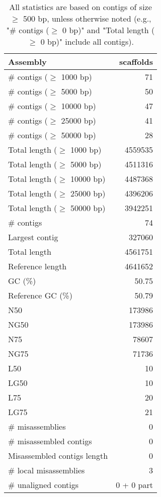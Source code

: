 \documentclass[12pt,a4paper]{article}
\begin{document}
\begin{table}[ht]
\begin{center}
\caption{All statistics are based on contigs of size $\geq$ 500 bp, unless otherwise noted (e.g., "\# contigs ($\geq$ 0 bp)" and "Total length ($\geq$ 0 bp)" include all contigs).}
\begin{tabular}{|l*{1}{|r}|}
\hline
Assembly & scaffolds \\ \hline
\# contigs ($\geq$ 1000 bp) & 71 \\ \hline
\# contigs ($\geq$ 5000 bp) & 50 \\ \hline
\# contigs ($\geq$ 10000 bp) & 47 \\ \hline
\# contigs ($\geq$ 25000 bp) & 41 \\ \hline
\# contigs ($\geq$ 50000 bp) & 28 \\ \hline
Total length ($\geq$ 1000 bp) & 4559535 \\ \hline
Total length ($\geq$ 5000 bp) & 4511316 \\ \hline
Total length ($\geq$ 10000 bp) & 4487368 \\ \hline
Total length ($\geq$ 25000 bp) & 4396206 \\ \hline
Total length ($\geq$ 50000 bp) & 3942251 \\ \hline
\# contigs & 74 \\ \hline
Largest contig & 327060 \\ \hline
Total length & 4561751 \\ \hline
Reference length & 4641652 \\ \hline
GC (\%) & 50.75 \\ \hline
Reference GC (\%) & 50.79 \\ \hline
N50 & 173986 \\ \hline
NG50 & 173986 \\ \hline
N75 & 78607 \\ \hline
NG75 & 71736 \\ \hline
L50 & 10 \\ \hline
LG50 & 10 \\ \hline
L75 & 20 \\ \hline
LG75 & 21 \\ \hline
\# misassemblies & 0 \\ \hline
\# misassembled contigs & 0 \\ \hline
Misassembled contigs length & 0 \\ \hline
\# local misassemblies & 3 \\ \hline
\# unaligned contigs & 0 + 0 part \\ \hline

\end{tabular}
\end{center}
\end{table}
\end{document}

